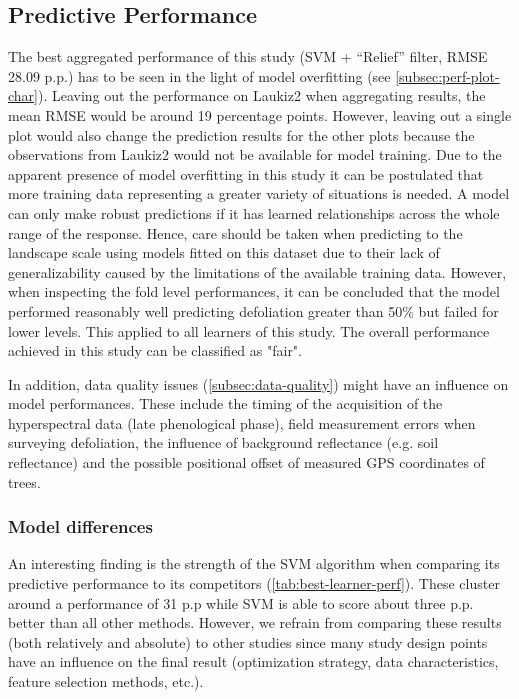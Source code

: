 \documentclass[peerreview]{IEEEtran}
\begin{document}
\subsection{Predictive Performance}

The best aggregated performance of this study (SVM + \enquote{Relief} filter, RMSE 28.09 p.p.) has to be seen in the light of model overfitting (see \autoref{subsec:perf-plot-char}).
Leaving out the performance on Laukiz2 when aggregating results, the mean RMSE would be around 19 percentage points.
However, leaving out a single plot would also change the prediction results for the other plots because the observations from Laukiz2 would not be available for model training.
Due to the apparent presence of model overfitting in this study it can be postulated that more training data representing a greater variety of situations is needed.
A model can only make robust predictions if it has learned relationships across the whole range of the response.
Hence, care should be taken when predicting to the landscape scale using models fitted on this dataset due to their lack of generalizability caused by the limitations of the available training data.
However, when inspecting the fold level performances, it can be concluded that the model performed reasonably well predicting defoliation greater than 50\% but failed for lower levels.
This applied to all learners of this study.
The overall performance achieved in this study can be classified as "fair".

In addition, data quality issues (\autoref{subsec:data-quality}) might have an influence on model performances.
These include the timing of the acquisition of the hyperspectral data (late phenological phase), field measurement errors when surveying defoliation, the influence of background reflectance (e.g. soil reflectance) and the possible positional offset of measured GPS coordinates of trees.

\subsubsection{Model differences}

An interesting finding is the strength of the SVM algorithm when comparing its predictive performance to its competitors (\autoref{tab:best-learner-perf}).
These cluster around a performance of 31 p.p while SVM is able to score about three p.p. better than all other methods.
However, we refrain from comparing these results (both relatively and absolute) to other studies since many study design points have an influence on the final result (optimization strategy, data characteristics, feature selection methods, etc.).
\end{document}

